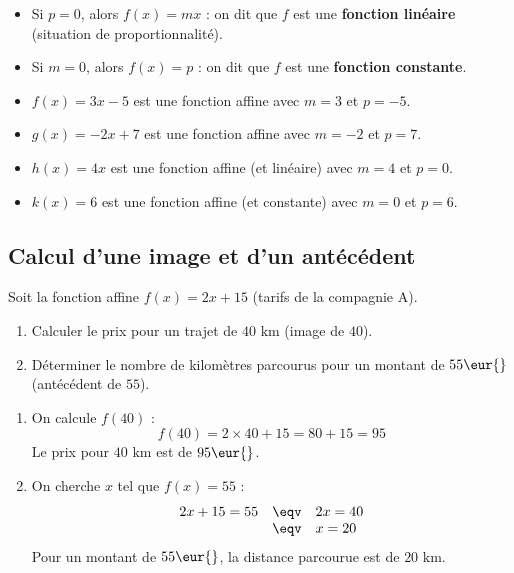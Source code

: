 \begin{rem}
	\nline
	\begin{itemize}
		\item Si $p = 0$, alors $f(x) = mx$ : on dit que $f$ est une \textbf{fonction linéaire} (situation de proportionnalité).
		\item Si $m = 0$, alors $f(x) = p$ : on dit que $f$ est une \textbf{fonction constante}.
	\end{itemize}
\end{rem}

\begin{ex}
	\nline
	\begin{itemize}
		\item $f(x) = 3x - 5$ est une fonction affine avec $m = 3$ et $p = -5$.
		\item $g(x) = -2x + 7$ est une fonction affine avec $m = -2$ et $p = 7$.
		\item $h(x) = 4x$ est une fonction affine (et linéaire) avec $m = 4$ et $p = 0$.
		\item $k(x) = 6$ est une fonction affine (et constante) avec $m = 0$ et $p = 6$.
	\end{itemize}
\end{ex}

\newpage

\subsection{Calcul d'une image et d'un antécédent}

\begin{methode}
	Soit la fonction affine $f(x) = 2x + 15$ (tarifs de la compagnie A).
	\begin{enumerate}
		\item Calculer le prix pour un trajet de $40\text{ km}$ (image de $40$).
		\item Déterminer le nombre de kilomètres parcourus pour un montant de $55\eur{}$ (antécédent de $55$).
	\end{enumerate}

	\begin{correction}
		\nline
		\begin{enumerate}
			\item On calcule $f(40)$ :
			      \[
				      f(40) = 2 \times 40 + 15 = 80 + 15 = 95
			      \]
			      Le prix pour $40\text{ km}$ est de $95\eur{}$.

			\item On cherche $x$ tel que $f(x) = 55$ :
			      \[
				      \begin{array}{rcl}
					      2x + 15 = 55 & \eqv & 2x = 40 \\ &\eqv& x = 20
				      \end{array}
			      \]
			      Pour un montant de $55\eur{}$, la distance parcourue est de $20\text{ km}$.
		\end{enumerate}
	\end{correction}
\end{methode}

